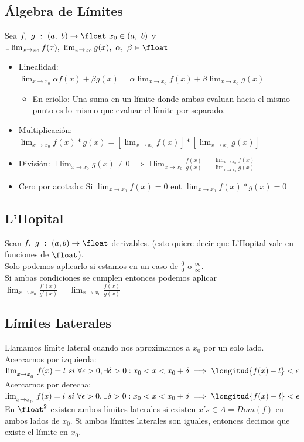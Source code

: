 \documentclass[10pt,a4paper]{article}
\newcommand{\limitDef}{f(x) = l \ si \ \forall \epsilon > 0, \exists \delta > 0 : x_{0} < x < x_{0} + \delta \implies \longitud{f(x)-l}<\epsilon}
\begin{document}
\subsection*{Álgebra de Límites}
Sea $f, \ g \ : \ (a, \ b) \rightarrow \float \ x_{0} \in (a, \ b)$ y $\exists \lim_{x\to x_{0}} f(x), \ \lim_{x\to x_{0}} g(x), \ \alpha, \ \beta \in \float  $
\begin{itemize}
    \item Linealidad: $\lim_{x\to x_{0}} \alpha f(x) + \beta g(x) = \alpha \lim_{x\to x_{0}} f(x) + \beta \lim_{x\to x_{0}} g(x) $
    \begin{itemize}
        \item En criollo: Una suma en un límite donde ambas evaluan hacia el mismo punto es lo mismo que evaluar el límite por separado. 
    \end{itemize}
    \item Multiplicación: $\lim_{x\to x_{0}} f(x) * g(x) = [\lim_{x\to x_{0}} f(x)] * [\lim_{x\to x_{0}} g(x)] $
    \item División: $\exists \lim_{x\to x_{0}} g(x) \neq 0 \implies \exists \lim_{x\to x_{0}} \frac{f(x)}{g(x)} = \frac{\lim_{x\to x_{0}} f(x)}{\lim_{x\to x_{0}} g(x)}  $
    \item Cero por acotado: Si $\lim_{x\to x_{0}} f(x) = 0$ ent $\lim_{x\to x_{0}} f(x) * g(x) = 0$

\end{itemize}
\subsection*{L'Hopital}
Sean $f, \ g \ : \ (a, b) \rightarrow \float $ derivables. (esto quiere decir que L'Hopital vale en funciones de $\float$). \\
Solo podemos aplicarlo si estamos en un caso de $\frac{0}{0}$ o $\frac{\infty}{\infty}$. \\
Si ambas condiciones se cumplen entonces podemos aplicar
$\lim_{x\to x_{0}} \frac{f'(x)}{g'(x)} = \lim_{x\to x_{0}} \frac{f(x)}{g(x)} $
\subsection*{Límites Laterales}
Llamamos límite lateral cuando nos aproximamos a $x_{0}$ por un solo lado. \\
Acercarnos por izquierda: $\lim_{x\to x_{0}^{-}} \limitDef$  \\
Acercarnos por derecha: $\lim_{x\to x_{0}^{+}} \limitDef$ \\
En $\float^{2}$ existen ambos límites laterales si existen $x's \in A = Dom(f)$ en ambos lados de $x_{0}$. Si ambos límites laterales son iguales, entonces decimos que existe el límite en $x_{0}$.
\end{document}

